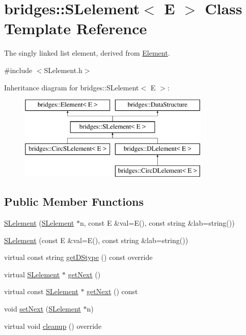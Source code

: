 \hypertarget{classbridges_1_1_s_lelement}{}\section{bridges\+:\+:S\+Lelement$<$ E $>$ Class Template Reference}
\label{classbridges_1_1_s_lelement}


The singly linked list element, derived from \hyperlink{classbridges_1_1_element}{Element}.  




{\ttfamily \#include $<$S\+Lelement.\+h$>$}

Inheritance diagram for bridges\+:\+:S\+Lelement$<$ E $>$\+:\begin{figure}[H]
\begin{center}
\leavevmode
\includegraphics[height=4.000000cm]{classbridges_1_1_s_lelement}
\end{center}
\end{figure}
\subsection*{Public Member Functions}
\begin{DoxyCompactItemize}
\item 
\hyperlink{classbridges_1_1_s_lelement_a9ddac46a935b85cde76305135d16de0a}{S\+Lelement} (\hyperlink{classbridges_1_1_s_lelement}{S\+Lelement} $\ast$n, const E \&val=E(), const string \&lab=string())
\item 
\hyperlink{classbridges_1_1_s_lelement_a76423021747b1f2090847c418c13352b}{S\+Lelement} (const E \&val=E(), const string \&lab=string())
\item 
virtual const string \hyperlink{classbridges_1_1_s_lelement_a136330b3481a47b3edb429f323274655}{get\+D\+Stype} () const override
\item 
virtual \hyperlink{classbridges_1_1_s_lelement}{S\+Lelement} $\ast$ \hyperlink{classbridges_1_1_s_lelement_a5bd74108a9aa49339378bf62cdbb19ca}{get\+Next} ()
\item 
virtual const \hyperlink{classbridges_1_1_s_lelement}{S\+Lelement} $\ast$ \hyperlink{classbridges_1_1_s_lelement_a4422b7731a84734d312b8cd8e241b1e8}{get\+Next} () const
\item 
void \hyperlink{classbridges_1_1_s_lelement_a347f8809406f930ce83bf44764a4f1b5}{set\+Next} (\hyperlink{classbridges_1_1_s_lelement}{S\+Lelement} $\ast$n)
\item 
virtual void \hyperlink{classbridges_1_1_s_lelement_ac747648849874407e9d907bb4557dd52}{cleanup} () override
\end{DoxyCompactItemize}
